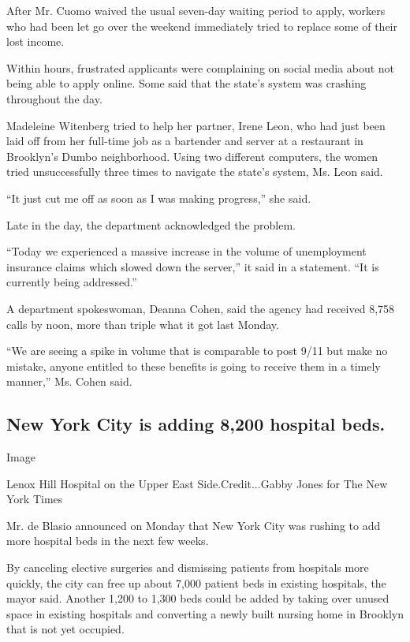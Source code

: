 After Mr. Cuomo waived the usual seven-day waiting period to apply,
workers who had been let go over the weekend immediately tried to
replace some of their lost income.

Within hours, frustrated applicants were complaining on social media
about not being able to apply online. Some said that the state's system
was crashing throughout the day.

Madeleine Witenberg tried to help her partner, Irene Leon, who had just
been laid off from her full-time job as a bartender and server at a
restaurant in Brooklyn's Dumbo neighborhood. Using two different
computers, the women tried unsuccessfully three times to navigate the
state's system, Ms. Leon said.

``It just cut me off as soon as I was making progress,'' she said.

Late in the day, the department acknowledged the problem.

``Today we experienced a massive increase in the volume of unemployment
insurance claims which slowed down the server,'' it said in a statement.
``It is currently being addressed.''

A department spokeswoman, Deanna Cohen, said the agency had received
8,758 calls by noon, more than triple what it got last Monday.

``We are seeing a spike in volume that is comparable to post 9/11 but
make no mistake, anyone entitled to these benefits is going to receive
them in a timely manner,'' Ms. Cohen said.

\hypertarget{new-york-city-is-adding-8200-hospital-beds}{%
\subsection{New York City is adding 8,200 hospital
beds.}\label{new-york-city-is-adding-8200-hospital-beds}}

Image

Lenox Hill Hospital on the Upper East Side.Credit...Gabby Jones for The
New York Times

Mr. de Blasio announced on Monday that New York City was rushing to add
more hospital beds in the next few weeks.

By canceling elective surgeries and dismissing patients from hospitals
more quickly, the city can free up about 7,000 patient beds in existing
hospitals, the mayor said. Another 1,200 to 1,300 beds could be added by
taking over unused space in existing hospitals and converting a newly
built nursing home in Brooklyn that is not yet occupied.


